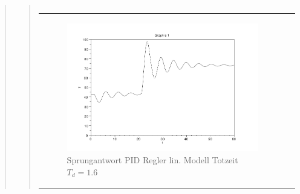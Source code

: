\begin{quote}
\begin{quote}
\begin{center}
\begin{tabular}{ll}
                \end{tabular}
            \end{center}

            \begin{center}
                \begin{tabular}{ll}
                
                \hspace{-1cm}
                    \begin{minipage}{0.6\textwidth}
                        \begin{figure}[H]
                            \includegraphics[scale=0.4, trim = 0cm 0cm 0cm
                            0cm, clip]
                            {./Bilder/4_1_Td_16}
                              \caption{Sprungantwort PID Regler lin. Modell Totzeit $T_d = 1.6$}
                        \end{figure}
                    \end{minipage}
                    

\end{tabular}
\end{center}
\end{quote}
\end{quote}
